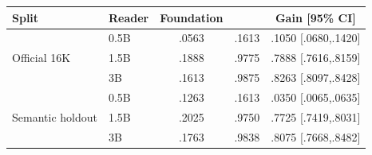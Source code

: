 \begin{tabular}{llccc}
\toprule
Split & Reader & Foundation & \ascent{} & Gain [95\% CI] \\
\midrule
\multirow{3}{*}{Official 16K} & 0.5B & .0563 & .1613 & .1050 [.0680,.1420] \\
 & 1.5B & .1888 & .9775 & .7888 [.7616,.8159] \\
 & 3B & .1613 & .9875 & .8263 [.8097,.8428] \\
\midrule
\multirow{3}{*}{Semantic holdout} & 0.5B & .1263 & .1613 & .0350 [.0065,.0635] \\
 & 1.5B & .2025 & .9750 & .7725 [.7419,.8031] \\
 & 3B & .1763 & .9838 & .8075 [.7668,.8482] \\
\bottomrule
\end{tabular}

